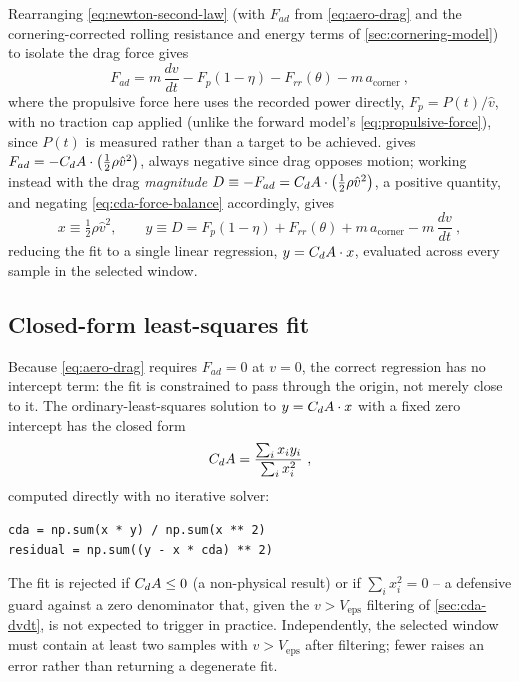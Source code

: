 Rearranging \cref{eq:newton-second-law} (with $F_{ad}$ from
\cref{eq:aero-drag} and the cornering-corrected rolling resistance and energy
terms of \cref{sec:cornering-model}) to isolate the drag force gives
\begin{equation}
    F_{ad} = m\,\frac{dv}{dt} - F_p(1-\eta) - F_{rr}(\theta) - m\,a_{\mathrm{corner}}\ ,
    \label{eq:cda-force-balance}
\end{equation}
where the propulsive force here uses the recorded power directly,
$F_p = P(t)/\hat v$, with no traction cap applied (unlike the forward model's
\cref{eq:propulsive-force}), since $P(t)$ is measured rather than a target to be
achieved.  gives $F_{ad} = -C_{d}A \cdot
\bigl(\tfrac{1}{2}\rho \hat v^2\bigr)$, always negative since drag opposes
motion; working instead with the drag \emph{magnitude}
$D \equiv -F_{ad} = C_{d}A \cdot \bigl(\tfrac{1}{2}\rho \hat v^2\bigr)$, a
positive quantity, and negating \cref{eq:cda-force-balance} accordingly, gives
\begin{equation}
    x \equiv \tfrac{1}{2}\rho \hat v^2, \qquad
    y \equiv D = F_p(1-\eta) + F_{rr}(\theta) + m\,a_{\mathrm{corner}} - m\,\frac{dv}{dt}\ ,
    \label{eq:cda-xy}
\end{equation}
reducing the fit to a single linear regression, $y = C_{d}A \cdot x$, evaluated
across every sample in the selected window.

\subsection{Closed-form least-squares fit}
\label{sec:cda-ols}

Because \cref{eq:aero-drag} requires $F_{ad} = 0$ at $v = 0$, the correct
regression has no intercept term: the fit is constrained to pass through the
origin, not merely close to it. The ordinary-least-squares solution to
$y = C_{d}A \cdot x$ with a fixed zero intercept has the closed form
\begin{equation}
    C_{d}A = \frac{\sum_i x_i y_i}{\sum_i x_i^2}\ ,
    \label{eq:cda-closed-form}
\end{equation}
computed directly with no iterative solver:
\begin{lstlisting}
cda = np.sum(x * y) / np.sum(x ** 2)
residual = np.sum((y - x * cda) ** 2)
\end{lstlisting}
The fit is rejected if $C_{d}A \leq 0$ (a non-physical result) or if
$\sum_i x_i^2 = 0$ -- a defensive guard against a zero denominator that, given
the $v > V_{\mathrm{eps}}$ filtering of \cref{sec:cda-dvdt}, is not expected to
trigger in practice. Independently, the selected window must contain at least
two samples with $v > V_{\mathrm{eps}}$ after filtering; fewer raises an error
rather than returning a degenerate fit.

